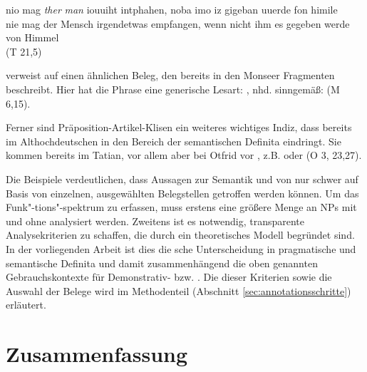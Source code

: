 \begin{exe} 
\ex \label{ex:gen-tat-def}
	\gll nio mag \textit{ther} \textit{man} iouuiht intphahen, noba imo iz gigeban uuerde fon himile \\
		nie mag der Mensch irgendetwas empfangen, {wenn nicht} ihm es gegeben werde von Himmel\\
	\trans {} (T 21,5)
\end{exe}
\noindent 
\textcite{Petrova2020} verweist auf einen ähnlichen Beleg, den bereits \textcite[60]{Hodler1954} in den Monseer Fragmenten beschreibt. Hier hat die Phrase   eine  generische  Lesart:  , nhd. sinngemäß:  (M 6,15). 

Ferner sind Präposition-Artikel-Klisen  ein weiteres wichtiges Indiz, dass  bereits im Althochdeutschen in den Bereich der semantischen Definita  eindringt. Sie kommen bereits im Tatian, vor allem aber bei Otfrid vor \parencite[vgl.][]{Nubling1992,Schlachter2015}, z.B.   oder   (O 3, 23,27). 

Die Beispiele verdeutlichen, dass Aussagen zur Semantik und  von  nur schwer auf Basis von einzelnen, ausgewählten Belegstellen getroffen werden können. Um das Funk"-tions"-spektrum zu erfassen, muss erstens eine größere Menge an NPs  mit und ohne  analysiert werden. Zweitens ist es notwendig, transparente Analysekriterien zu schaffen, die durch ein theoretisches Modell begründet sind. In der vorliegenden Arbeit ist dies die \citeauthor{Lobner1985}sche Unterscheidung in pragmatische  und semantische Definita  und damit zusammenhängend die oben genannten Gebrauchskontexte für Demonstrativ-  bzw. . Die  dieser Kriterien sowie die Auswahl der Belege wird im Methodenteil (Abschnitt \ref{sec:annotationsschritte}) erläutert. 

\section{Zusammenfassung}

